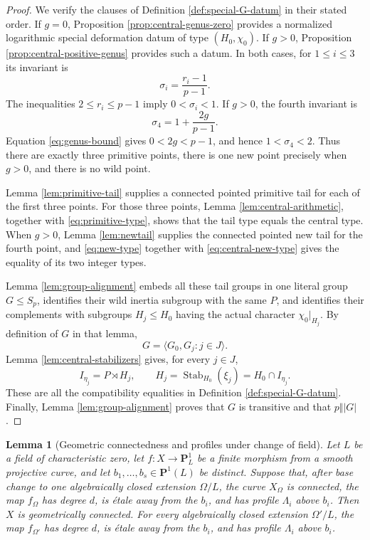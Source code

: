 \documentclass[10pt,a4paper]{amsart}
\newtheorem{lemma}[theorem]{Lemma}
\numberwithin{equation}{section}
\begin{document}
\begin{proof}
We verify the clauses of Definition \ref{def:special-G-datum} in their
stated order.  If $g=0$, Proposition \ref{prop:central-genus-zero} provides
a normalized logarithmic special deformation datum of type
$(H_0,\chi_0)$.  If $g>0$, Proposition
\ref{prop:central-positive-genus} provides such a datum.  In both cases,
for $1\leq i\leq3$ its invariant is
\[
 \sigma_i=\frac{r_i-1}{p-1}.
\]
The inequalities $2\leq r_i\leq p-1$ imply
$0<\sigma_i<1$.  If $g>0$, the fourth invariant is
\[
 \sigma_4=1+\frac{2g}{p-1}.
\]
Equation \eqref{eq:genus-bound} gives $0<2g<p-1$, and hence
$1<\sigma_4<2$.  Thus there are exactly three primitive points, there is
one new point precisely when $g>0$, and there is no wild point.

Lemma \ref{lem:primitive-tail} supplies a connected pointed primitive tail
for each of the first three points.  For those three points, Lemma
\ref{lem:central-arithmetic}, together with \eqref{eq:primitive-type},
shows that the tail type equals the central type.  When $g>0$, Lemma
\ref{lem:newtail} supplies the connected pointed new tail for the fourth
point, and \eqref{eq:new-type} together with
\eqref{eq:central-new-type} gives the equality of its two integer types.

Lemma \ref{lem:group-alignment} embeds all these tail groups in one literal
group $G\leq S_p$, identifies their wild inertia subgroup with the same
$P$, and identifies their complements with subgroups $H_j\leq H_0$ having
the actual character $\chi_0|_{H_j}$.  By definition of $G$ in that lemma,
\[
 G=\langle G_0,G_j:j\in J\rangle.
\]
Lemma \ref{lem:central-stabilizers} gives, for every $j\in J$,
\[
 I_{\eta_j}=P\rtimes H_j,
 \qquad
 H_j=\operatorname{Stab}_{H_0}(\xi_j)=H_0\cap I_{\eta_j}.
\]
These are all the compatibility equalities in Definition
\ref{def:special-G-datum}.  Finally, Lemma \ref{lem:group-alignment} proves
that $G$ is transitive and that $p\Vert |G|$.
\end{proof}

\begin{lemma}[Geometric connectedness and profiles under change of field]
\label{lem:char-zero-base-change}
Let $L$ be a field of characteristic zero, let
$f:X\to\mathbf P^1_L$ be a finite morphism from a smooth projective curve,
and let $b_1,\ldots,b_s\in\mathbf P^1(L)$ be distinct.  Suppose that, after
base change to one algebraically closed extension $\Omega/L$, the curve
$X_\Omega$ is connected, the map $f_\Omega$ has degree $d$, is \'etale away
from the $b_i$, and has profile $\Lambda_i$ above $b_i$.  Then $X$ is
geometrically connected.  For every algebraically closed extension
$\Omega'/L$, the map $f_{\Omega'}$ has degree $d$, is \'etale away from the
$b_i$, and has profile $\Lambda_i$ above $b_i$.
\end{lemma}
\end{document}
